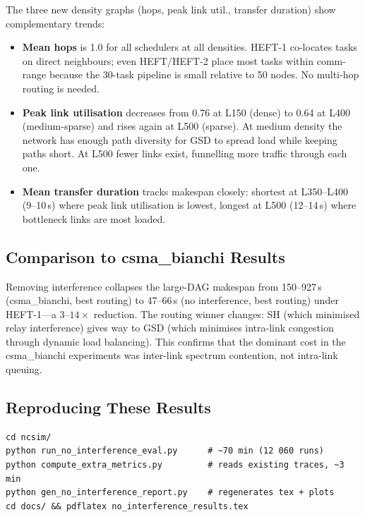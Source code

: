 \documentclass[11pt]{article}
\begin{document}
The three new density graphs (hops, peak link util., transfer duration) show complementary trends:

\begin{itemize}
  \item \textbf{Mean hops} is 1.0 for all schedulers at all densities.    HEFT-1 co-locates tasks on direct neighbours; even HEFT/HEFT-2 place    most tasks within comm-range because the 30-task pipeline is small    relative to 50 nodes. No multi-hop routing is needed.
  \item \textbf{Peak link utilisation} decreases from 0.76 at L150 (dense)    to 0.64 at L400 (medium-sparse) and rises again at L500 (sparse).    At medium density the network has enough path diversity for GSD to    spread load while keeping paths short. At L500 fewer links exist,    funnelling more traffic through each one.
  \item \textbf{Mean transfer duration} tracks makespan closely: shortest    at L350--L400 (9--10\,s) where peak link utilisation is lowest,    longest at L500 (12--14\,s) where bottleneck links are most loaded.
\end{itemize}

\subsection{Comparison to csma\_bianchi Results}

Removing interference collapses the large-DAG makespan from 150--927\,s (csma\_bianchi, best routing) to 47--66\,s (no interference, best routing) under HEFT-1---a $3$--$14\times$ reduction. The routing winner changes: SH (which minimised relay interference) gives way to GSD (which minimises intra-link congestion through dynamic load balancing). This confirms that the dominant cost in the csma\_bianchi experiments was inter-link spectrum contention, not intra-link queuing.

\subsection{Reproducing These Results}
\begin{verbatim}
cd ncsim/
python run_no_interference_eval.py      # ~70 min (12 060 runs)
python compute_extra_metrics.py         # reads existing traces, ~3 min
python gen_no_interference_report.py    # regenerates tex + plots
cd docs/ && pdflatex no_interference_results.tex
\end{verbatim}
\end{document}
